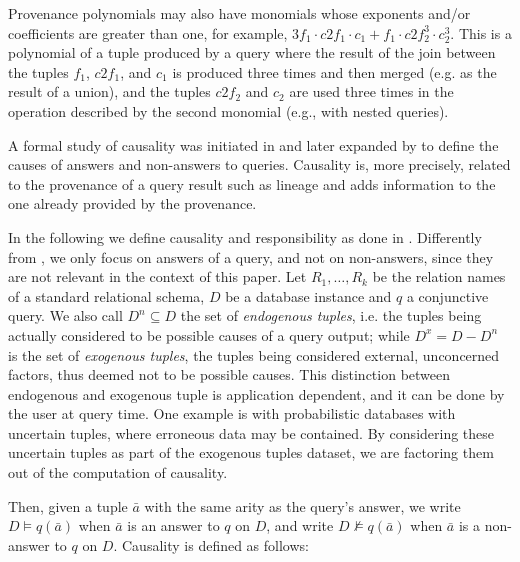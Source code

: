 Provenance polynomials may also have monomials whose exponents and/or coefficients are greater than one, for example, $3f_1 \cdot c2f_1 \cdot c_1 + f_1 \cdot c2f_2^3 \cdot c_2^3$. This is a polynomial of a tuple produced by a query where the result of the join between the tuples $f_1$, $c2f_1$, and $c_1$ is produced three times and then merged (e.g. as the result of a union), and the tuples $c2f_2$ and $c_2$ are used three times in the operation described by the second monomial (e.g., with nested queries). 

\label{sec:responsibility}

A formal study of causality was initiated in \cite{Halpern2013Causality,ChocklerH04} and later expanded by \citet{MeliouGMS11} to define the causes of answers and non-answers to queries. Causality is, more precisely, related to the provenance of a query result such as lineage and adds information to the one already provided by the provenance.

In the following we define causality and responsibility as done in \cite{MeliouGMS11}. Differently from \cite{MeliouGMS11}, we only focus on answers of a query, and not on non-answers, since they are not relevant in the context of this paper.
Let $R_1, \dots, R_k$ be the relation names of a standard relational schema, $D$ be a database instance and $q$ a conjunctive query. We also call $D^n \subseteq D$ the set of \emph{endogenous tuples}, i.e. the tuples being actually considered to be possible causes of a query output; while $D^x = D - D^n$ is the set of \emph{exogenous tuples}, the tuples being considered external, unconcerned factors, thus deemed not to be possible causes. 
This distinction between endogenous and exogenous tuple is application dependent, and it can be done by the user at query time. 
One example is with probabilistic databases with uncertain tuples, where erroneous data may be contained. By considering these uncertain tuples as part of the exogenous tuples dataset, we are factoring them out of the computation of causality. 

Then, given a tuple $\bar{a}$ with the same arity as the query's answer, we write $D \vDash q(\bar{a})$ when $\bar{a}$ is an answer to $q$ on $D$, and write $D \nvDash q(\bar{a})$ when $\bar{a}$ is a non-answer to $q$ on $D$.
Causality is defined as follows:

